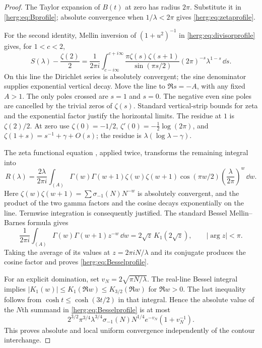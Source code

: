 \begin{proof}
The Taylor expansion of $B(t)$ at zero has radius $2\pi$.
Substitute it in \eqref{herg:eq:Bprofile}; absolute convergence
when $1/\lambda<2\pi$ gives \eqref{herg:eq:zetaprofile}.

For the second identity, Mellin inversion of $(1+u^2)^{-1}$ in
\eqref{herg:eq:divisorprofile} gives, for $1<c<2$,
\begin{equation}\label{herg:eq:Mellin}
 S(\lambda)-\frac{\zeta(2)}2
 =\frac1{2\pi i}\int_{c-i\infty}^{c+i\infty}
   \frac{\pi\zeta(s)\zeta(s+1)}{\sin(\pi s/2)}
       (2\pi)^{-s}\lambda^{1-s}\,\dd s.
\end{equation}
On this line the Dirichlet series is absolutely convergent; the
sine denominator supplies exponential vertical decay. Move the
line to $\Re s=-A$, with any fixed $A>1$. The only poles crossed
are $s=1$ and $s=0$. The negative even sine poles are cancelled
by the trivial zeros of $\zeta(s)$. Standard vertical-strip bounds
for zeta and the exponential factor justify the horizontal limits.
The residue at $1$ is $\zeta(2)/2$. At zero use
$\zeta(0)=-1/2$, $\zeta'(0)=-\frac12\log(2\pi)$, and
$\zeta(1+s)=s^{-1}+\gamma+O(s)$; the residue is
$\lambda(\log\lambda-\gamma)$.

The zeta functional equation \cite{herg:DLMFzeta}, applied twice,
transforms the remaining integral into
\begin{equation}\label{herg:eq:dualMellin}
 R(\lambda)=\frac{2\lambda}{2\pi i}\int_{(A)}
  \Gamma(w)\Gamma(w+1)\zeta(w)\zeta(w+1)
  \cos(\pi w/2)\left(\frac\lambda{2\pi}\right)^w\,\dd w.
\end{equation}
Here $\zeta(w)\zeta(w+1)=\sum\sigma_{-1}(N)N^{-w}$ is
absolutely convergent, and the product of the two gamma factors
and the cosine decays exponentially on the line. Termwise
integration is consequently justified. The standard Bessel
Mellin--Barnes formula \cite[Eq.~10.32.13]{herg:DLMFbessel} gives
\[
 \frac1{2\pi i}\int_{(A)}\Gamma(w)\Gamma(w+1)z^{-w}\,\dd w
       =2\sqrt z\,K_1(2\sqrt z),\qquad |\arg z|<\pi.
\]
Taking the average of its values at $z=2\pi iN/\lambda$ and
its conjugate produces the cosine factor and proves
\eqref{herg:eq:Besselprofile}.

For an explicit domination, set $v_N=2\sqrt{\pi N/\lambda}$.
The real-line Bessel integral implies
$|K_1(w)|\leq K_1(\Re w)\leq K_{3/2}(\Re w)$ for
$\Re w>0$. The last inequality follows from
$\cosh t\leq\cosh(3t/2)$ in that integral. Hence the absolute
value of the $N$th summand in \eqref{herg:eq:Besselprofile} is at most
\begin{equation}\label{herg:eq:sectorbound}
 2^{3/2}\pi^{3/4}\lambda^{3/4}\sigma_{-1}(N)N^{1/4}
                       e^{-v_N}(1+v_N^{-1}).
\end{equation}
This proves absolute and local uniform convergence independently
of the contour interchange.
\end{proof}

